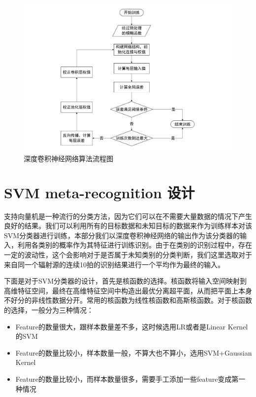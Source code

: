 \begin{figure}
	\centering
	\includegraphics{figures/cnn_flow.pdf}
	\caption{深度卷积神经网络算法流程图}
\end{figure}


\section{SVM meta-recognition 设计}

支持向量机是一种流行的分类方法，因为它们可以在不需要大量数据的情况下产生良好的结果。我们可以利用所有的目标数据和未知目标的数据来作为训练样本对该SVM分类器进行训练，本部分我们以深度卷积神经网络的输出作为该分类器的输入，利用各类别的概率作为其特征进行训练识别。由于在类别的识别过程中，存在一定的波动性，这个会影响对于是否属于未知类别的分类判断，我们这里选取对于来自同一个辐射源的连续10拍的识别结果进行一个平均作为最终的输入。

下面是对于SVM分类器的设计，首先是核函数的选择。核函数将输入空间映射到高维特征空间，最终在高维特征空间中构造出最优分离超平面，从而把平面上本身不好分的非线性数据分开。常用的核函数为线性核函数和高斯核函数。对于核函数的选择，一般分为三种情况：

\begin{itemize}
	\item  Feature的数量很大，跟样本数量差不多，这时候选用LR或者是Linear Kernel的SVM
	\item  Feature的数量比较小，样本数量一般，不算大也不算小，选用SVM+Gaussian Kernel
	\item  Feature的数量比较小，而样本数量很多，需要手工添加一些feature变成第一种情况
\end{itemize}

